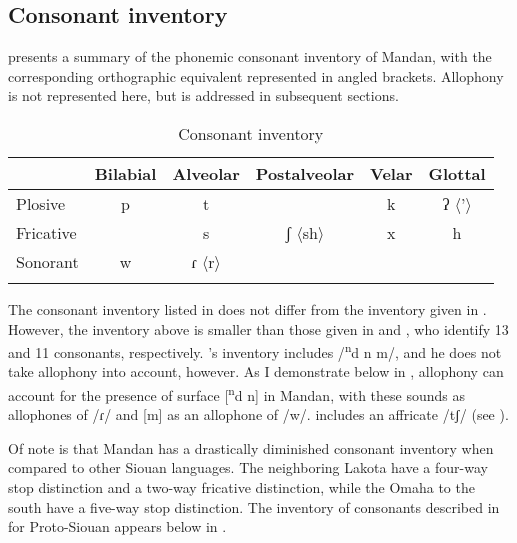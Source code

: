 \subsection{Consonant inventory}\label{inventory}

 presents a summary of the phonemic consonant inventory of Mandan, with the corresponding orthographic equivalent represented in angled brackets. Allophony is not represented here, but is addressed in subsequent sections.

\begin{table}
\begin{center}
\caption{Consonant inventory} \label{consonantinventory}
\begin{tabular}{lccccc}
\lsptoprule
          & Bilabial & Alveolar & Postalveolar & Velar & Glottal \\
\midrule
Plosive   & p        & t        &               & k     & ʔ $\langle$'$\rangle$    \\
Fricative &          & s        & ʃ $\langle$sh$\rangle$          & x     & h       \\
Sonorant  & w        & ɾ $\langle$r$\rangle$         &          	&       &         \\ \lspbottomrule
\end{tabular}
\end{center}

\end{table}

The consonant inventory listed in  does not differ from the inventory given in \citet[14]{hollow1970}. However, the inventory above is smaller than those given in \citet[2]{kennard1936} and \citet[13]{mixco1997a}, who identify 13 and 11 consonants, respectively. \citeauthor{kennard1936}'s inventory includes /\textsuperscript{n}d n m/, and he does not take allophony into account, however. As I demonstrate below in , allophony can account for the presence of surface [\textsuperscript{n}d n] in Mandan, with these sounds as allophones of /ɾ/ and [m] as an allophone of /w/. \citeauthor{mixco1997a} includes an affricate /tʃ/ (see ).

Of note is that Mandan has a drastically diminished consonant inventory when compared to other Siouan languages. The neighboring Lakota have a four-way stop distinction and a two-way fricative distinction, while the Omaha to the south have a five-way stop distinction. The inventory of consonants described in \citet{rankinetalnd} for Proto-Siouan appears below in .

